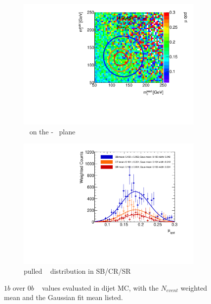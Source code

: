 \begin{figure}[htb!]
\centering
\captionsetup{justification=centering}
	\hspace{-1cm}
    \begin{subfigure}[b]{0.4\textwidth}
        \includegraphics[width=\textwidth,angle=-90]{figures/boosted/AppendixMuqcdstudy/QCD_OneTag_Incl_mH0H1.pdf}
        \caption{\muqcd~ on the \mleadJ-\msublJ~ plane}
        \label{fig:app-muqcd-1b-2d-qcd}
    \end{subfigure}
    \quad \quad \quad \quad 
    \begin{subfigure}[b]{0.4\textwidth}
        \includegraphics[width=\textwidth,angle=-90]{figures/boosted/AppendixMuqcdstudy/QCD_OneTag_Incl_mH0H1_pull.pdf}
        \caption{pulled \muqcd~ distribution in SB/CR/SR}
        \label{fig:app-muqcd-1b-pull-qcd}
    \end{subfigure}
\caption{$1b$ over $0b$ \muqcd~ values evaluated in dijet MC, with the $N_{event}$ weighted mean and the Gaussian fit mean listed.}
\label{fig:app-muqcd-1b-qcd}
\end{figure}

